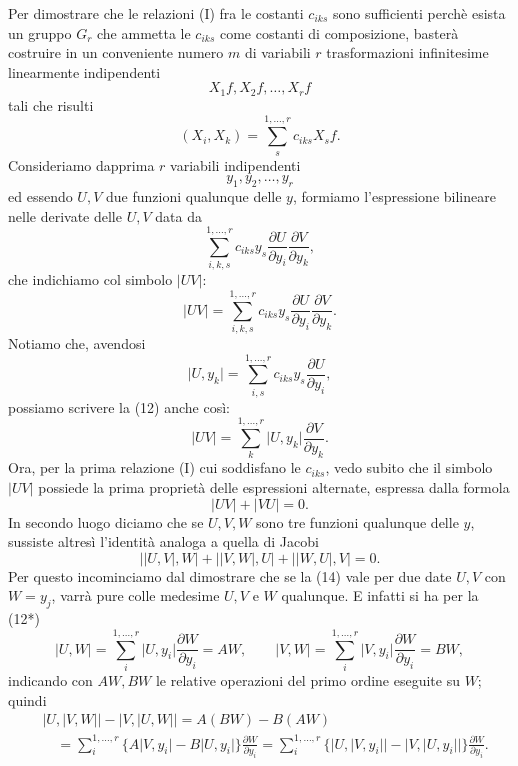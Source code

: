 \documentclass[11pt]{book}
\begin{document}
Per dimostrare che le relazioni (I) fra le costanti $c_{iks}$ sono sufficienti perchè esista un gruppo $G_r$ che ammetta le $c_{iks}$ come costanti di composizione, basterà costruire in un conveniente numero $m$ di variabili $r$ trasformazioni infinitesime linearmente indipendenti
\[
 X_1f,
 X_2f,
 \ldots,
 X_rf
\]
tali che risulti
\[
 (X_i,X_k)=\sum\limits_s^{1,\ldots,r}c_{iks}X_sf.
\]
Consideriamo dapprima $r$ variabili indipendenti
\[
 y_1,y_2,\ldots,y_r
\]
ed essendo $U,V$ due funzioni qualunque delle $y$, formiamo l'espressione bilineare nelle derivate delle $U,V$ data da
\[
 \sum\limits_{i,k,s}^{1,\ldots,r}c_{iks}y_s
       \frac{\partial U}{\partial y_i}\frac{\partial V}{\partial y_k},
\]
che indichiamo col simbolo $\lvert UV\rvert$:
\begin{equation*}\tag{12}
 \lvert UV\rvert=
 \sum\limits_{i,k,s}^{1,\ldots,r}c_{iks}y_s
       \frac{\partial U}{\partial y_i}\frac{\partial V}{\partial y_k}.
\end{equation*}
Notiamo che, avendosi
\[
 \lvert U,y_k\rvert=\sum\limits_{i,s}^{1,\ldots,r}c_{iks}y_s\frac{\partial U}{\partial y_i},
\]
possiamo scrivere la (12) anche così:
\begin{equation*}\tag{12*}
 \lvert UV\rvert=\sum\limits_k^{1,\ldots,r}\lvert U,y_k\rvert
                 \frac{\partial V}{\partial y_k}.
\end{equation*}
Ora, per la prima relazione (I) cui soddisfano le $c_{iks}$, vedo subito che il simbolo $\lvert UV\rvert$ possiede la prima proprietà delle espressioni alternate, espressa dalla formola
\begin{equation*}\tag{13}
 \lvert UV\rvert+\lvert VU\rvert=0.
\end{equation*}
In secondo luogo diciamo che se $U,V,W$ sono tre funzioni qualunque delle $y$, sussiste altresì l'identità analoga a quella di Jacobi
\begin{equation*}\tag{14}
 \lvert\lvert U,V\rvert,W\rvert+
 \lvert\lvert V,W\rvert,U\rvert+
 \lvert\lvert W,U\rvert,V\rvert=0.
\end{equation*}
Per questo incominciamo dal dimostrare che se la (14) vale per due date $U,V$ con $W=y_j$, varrà pure colle medesime $U,V$ e $W$ qualunque. E infatti si ha per la (12*)
\[
 \lvert U,W\rvert=\sum\limits_i^{1,\ldots,r}\lvert U,y_i\rvert\frac{\partial W}{\partial y_i}=AW,
 \qquad
 \lvert V,W\rvert=\sum\limits_i^{1,\ldots,r}\lvert V,y_i\rvert\frac{\partial W}{\partial y_i}=BW,
\]
indicando con $AW,BW$ le relative operazioni del primo ordine eseguite su $W$; quindi
\[
\begin{split}
&\lvert U,\lvert V,W\rvert\rvert-
 \lvert V,\lvert U,W\rvert\rvert
 =A(BW)-B(AW)                                                    \\
&\quad=\sum\limits_i^{1,\ldots,r}\{A\lvert V,y_i\rvert-B\lvert U,y_i\rvert\}\frac{\partial W}{\partial y_i}
 =\sum\limits_i^{1,\ldots,r}\{\lvert U,\lvert V,y_i\rvert\rvert-
                 \lvert V,\lvert U,y_i\rvert\rvert\}
       \frac{\partial W}{\partial y_i}.
\end{split}
\]
\end{document}
